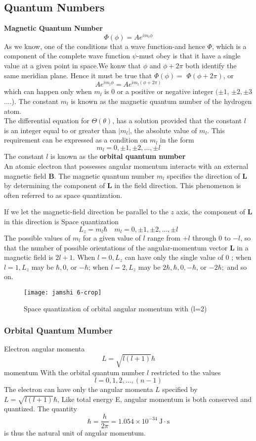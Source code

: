 \subsection{Quantum Numbers}
\textbf{Magnetic Quantum Number}
$$\Phi(\phi)=A e^{i m_{l} \phi}$$
As we know, one of the conditions that a wave function-and hence $\Phi$, which is a component of the complete wave function $\psi$-must obey is that it have a single value at a given point in space.We konw that $\phi$ and $\phi+2 \pi$ both identify the same meridian plane. Hence it must be true that $\Phi(\phi)=$ $\Phi(\phi+2 \pi)$, or
$$A e^{i m_{l} \phi}=A e^{i m_{l}(\phi+2 \pi)}$$
which can happen only when $m_{l}$ is 0 or a positive or negative integer $(\pm 1$, $\pm 2, \pm 3$....). The constant $m_{l}$ is known as the magnetic quantum number of the hydrogen atom.\\
The differential equation for $\Theta(\theta)$, has a solution provided that the constant $l$ is an integer equal to or greater than $\left|m_{l}\right|$, the absolute value of $m_{l}$. This requirement can be expressed as a condition on $m_{l}$ in the form
$$
m_{l}=0, \pm 1, \pm 2, \ldots, \pm l
$$
The constant $l$ is known as the \textbf{orbital quantum number}\\
An atomic electron that possesses angular momentum interacts with an external magnetic field $\mathbf{B}$. The magnetic quantum number $m_{l}$ specifies the direction of $\mathbf{L}$ by determining the component of $\mathbf{L}$ in the field direction. This phenomenon is often referred to as space quantization.

If we let the magnetic-field direction be parallel to the $z$ axis, the component of $\mathbf{L}$ in this direction is
Space quantization $$L_{z}=m_{l} \hbar \quad m_{l}=0, \pm 1, \pm 2, \ldots, \pm l$$
The possible values of $m_{l}$ for a given value of $l$ range from $+l$ through 0 to $-l$, so that the number of possible orientations of the angular-momentum vector $\mathbf{L}$ in a magnetic field is $2 l+1$. When $l=0, L_{z}$ can have only the single value of 0 ; when $l=1, L_{z}$ may be $\hbar, 0$, or $-\hbar$; when $l=2, L_{z}$ may be $2 \hbar, \hbar, 0,-\hbar$, or $-2 \hbar ;$ and so on.\\
\begin{figure}[H]
	\centering
	\texttt{[image: jamshi 6-crop]}
	\caption{Space quantization of orbital angular momentum with (l=2)}
	\label{}
\end{figure}
\subsubsection{Orbital Quantum Mumber}
Electron angular momenta 
$$
L=\sqrt{l(l+1)} \hbar
$$
momentum
With the orbital quantum number $l$ restricted to the values
$$
l=0,1,2, \ldots,(n-1)
$$
The electron can have only the angular momenta $L$ specified by $
L=\sqrt{l(l+1)} \hbar
$, Like total energy E, angular momentum is both conserved and quantized. The quantity
$$
\hbar=\frac{h}{2 \pi}=1.054 \times 10^{-34} \mathrm{~J} \cdot \mathrm{s}
$$
is thus the natural unit of angular momentum.
